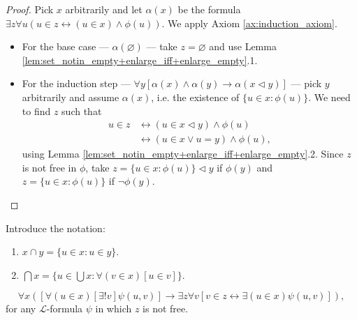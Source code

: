 \begin{proof}
    \leanok
    Pick $x$ arbitrarily and let $\alpha (x)$ be the formula $\exists z \forall u (u\in z \leftrightarrow (u \in x) \land \phi (u))$.
    We apply Axiom \ref{ax:induction_axiom}.
    \begin{itemize}
        \item For the base case — $\alpha (\varnothing)$ — take $z=\varnothing$ and use Lemma \ref{lem:set_notin_empty+enlarge_iff+enlarge_empty}.1.
        \item For the induction step — $\forall y[\alpha(x) \land \alpha(y) \rightarrow \alpha(x \lhd y)]$ — 
        pick $y$ arbitrarily and assume $\alpha(x)$, i.e. the existence of $ \{u \in x : \phi (u)\}$.
        We need to find $z$ such that
    \begin{equation*}
    \begin{split}
        u \in z & \leftrightarrow (u \in x \lhd y) \land \phi (u)\\
        & \leftrightarrow (u \in x \lor u = y) \land \phi (u),
    \end{split}
    \end{equation*}
    using Lemma \ref{lem:set_notin_empty+enlarge_iff+enlarge_empty}.2.
    Since $z$ is not free in $\phi$, take $z = \{u \in x : \phi (u)\} \lhd y$ if $\phi(y)$ 
    and $z=\{u \in x : \phi (u)\}$ if $\neg \phi(y)$.
    \end{itemize}
\end{proof}

\begin{definition}[Intersection]
    \label{def:Inter}
    \leanok
    Introduce the notation:
    \begin{enumerate}
        \item $x \cap y = \{u \in x : u \in y\}$.
        \item $\bigcap x = \{u \in \bigcup x : \forall (v \in x)[u \in v] \}$.
    \end{enumerate}  
\end{definition}

\begin{theorem}
    \label{thm:repl_scheme}
    \leanok
    $$\forall x ([\forall (u \in x) [\exists! v] \psi (u,v)]\rightarrow \exists z \forall v [v\in z \leftrightarrow \exists(u \in x) \psi (u,v)]),$$ 
    for any $\mathcal{L}$-formula $\psi$ in which $z$ is not free.
\end{theorem}

